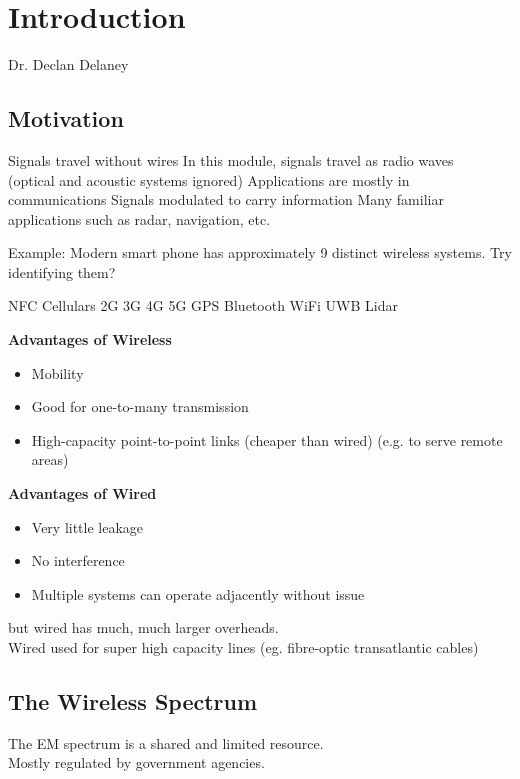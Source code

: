 \documentclass[12pt]{article}
\begin{document}
\section{Introduction}
Dr. Declan Delaney

\subsection{Motivation}
\begin{outline}[enumerate]
\1 Signals travel without wires
    \2 In this module, signals travel as radio waves\\
    (optical and acoustic systems ignored)
\1 Applications are mostly in communications
    \2 Signals modulated to carry information
    \2 Many familiar applications such as radar, navigation, etc.
\end{outline}

\begin{framed}
Example: Modern smart phone has approximately 9 distinct wireless systems. Try identifying them?
\begin{outline}[enumerate]
\1 NFC
\1 Cellulars
    \2 2G
    \2 3G
    \2 4G
    \2 5G
\1 GPS
\1 Bluetooth
\1 WiFi
\1 UWB
\1 Lidar
\end{outline}
\end{framed}

\textbf{Advantages of Wireless}
\begin{itemize}
\item Mobility
\item Good for one-to-many transmission
\item High-capacity point-to-point links (cheaper than wired) (e.g. to serve remote areas)
\end{itemize}

\textbf{Advantages of Wired}
\begin{itemize}
\item Very little leakage
\item No interference
\item Multiple systems can operate adjacently without issue
\end{itemize}
but wired has much, much larger overheads.\\
Wired used for super high capacity lines (eg. fibre-optic transatlantic cables)

\subsection{The Wireless Spectrum}
The EM spectrum is a shared and limited resource.\\
Mostly regulated by government agencies.
\end{document}
